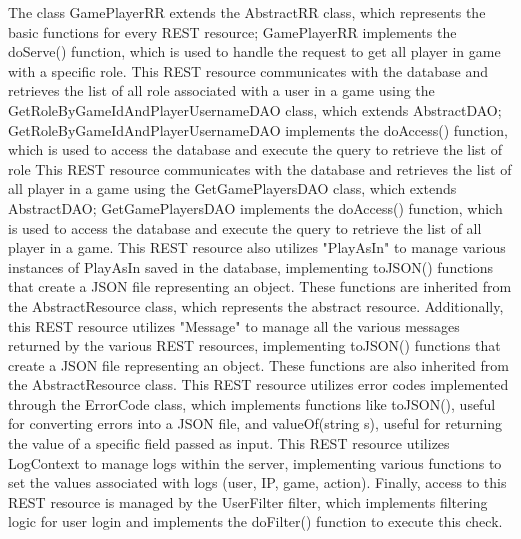 The class GamePlayerRR extends the AbstractRR class, which represents the basic functions for every REST resource; GamePlayerRR implements the doServe() function, which is used to handle the request to get all player in game with a specific role.
This REST resource communicates with the database and retrieves the list of all role associated with a user in a game using the GetRoleByGameIdAndPlayerUsernameDAO class, which extends AbstractDAO; GetRoleByGameIdAndPlayerUsernameDAO implements the doAccess() function, which is used to access the database and execute the query to retrieve the list of role
This REST resource communicates with the database and retrieves the list of all player  in a game using the GetGamePlayersDAO class, which extends AbstractDAO; GetGamePlayersDAO implements the doAccess() function, which is used to access the database and execute the query to retrieve the list of all player in a game.
This REST resource also utilizes "PlayAsIn" to manage various instances of PlayAsIn saved in the database, implementing toJSON() functions that create a JSON file representing an object. These functions are inherited from the AbstractResource class, which represents the abstract resource.
Additionally, this REST resource utilizes "Message" to manage all the various messages returned by the various REST resources, implementing toJSON() functions that create a JSON file representing an object. These functions are also inherited from the AbstractResource class.
This REST resource utilizes error codes implemented through the ErrorCode class, which implements functions like toJSON(), useful for converting errors into a JSON file, and valueOf(string s), useful for returning the value of a specific field passed as input.
This REST resource utilizes LogContext to manage logs within the server, implementing various functions to set the values associated with logs (user, IP, game, action).
Finally, access to this REST resource is managed by the UserFilter filter, which implements filtering logic for user login and implements the doFilter() function to execute this check.





